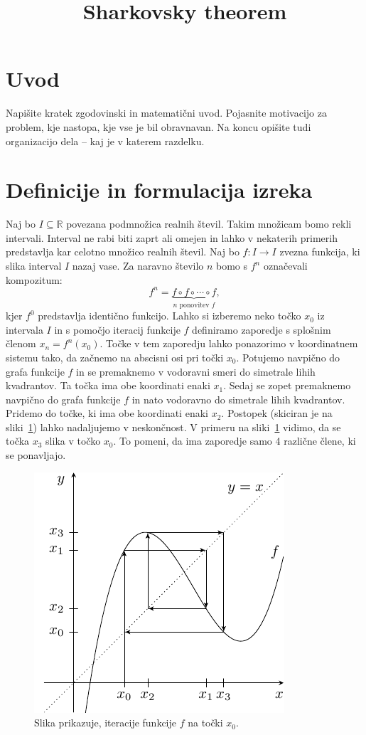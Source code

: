 \documentclass[mat2]{fmfdelo}
\title{Sharkovsky theorem}
\newcommand{\R}{\mathbb R}
\begin{document}
\section{Uvod}
Napišite kratek zgodovinski in matematični uvod.  Pojasnite motivacijo za problem, kje
nastopa, kje vse je bil obravnavan. Na koncu opišite tudi organizacijo dela -- kaj je v
katerem razdelku.

\section{Definicije in formulacija izreka}
Naj bo $I\subseteq \R$ povezana podmnožica realnih števil. Takim množicam bomo rekli intervali. Interval ne rabi biti zaprt ali omejen in lahko v nekaterih primerih predstavlja kar celotno množico realnih števil. Naj bo $f:I \to I$ zvezna funkcija, ki slika interval $I$ nazaj vase. Za naravno število $n$ bomo s $f^n$ označevali kompozitum:
$$f^n = \underbrace{f \circ f \circ \cdots \circ f}_{n \text{ ponovitev } f},$$
kjer $f^0$ predstavlja identično funkcijo. Lahko si izberemo neko točko $x_0$ iz intervala $I$ in s pomočjo iteracij funkcije $f$ definiramo zaporedje s splošnim členom $x_n = f^n(x_0)$. Točke v tem zaporedju lahko ponazorimo v koordinatnem sistemu tako, da začnemo na abscisni osi pri točki $x_0$. Potujemo navpično do grafa funkcije $f$ in se premaknemo v vodoravni smeri do simetrale lihih kvadrantov. Ta točka ima obe koordinati enaki $x_1$. Sedaj se zopet premaknemo navpično do grafa funkcije $f$ in nato vodoravno do simetrale lihih kvadrantov. Pridemo do točke, ki ima obe koordinati enaki $x_2$. Postopek (skiciran je na sliki~\ref{fig:iteracije}) lahko nadaljujemo v neskončnost. V primeru na sliki~\ref{fig:iteracije} vidimo, da se točka $x_3$ slika v točko $x_0$. To pomeni, da ima zaporedje samo 4 različne člene, ki se ponavljajo.

\begin{figure}[h]
  \centering
  \includegraphics[]{images/iteracije_f.pdf}
  \caption[Primer vektorske slike.]{Slika prikazuje, iteracije funkcije $f$ na točki $x_0$.}
  \label{fig:iteracije}
\end{figure}
\end{document}
